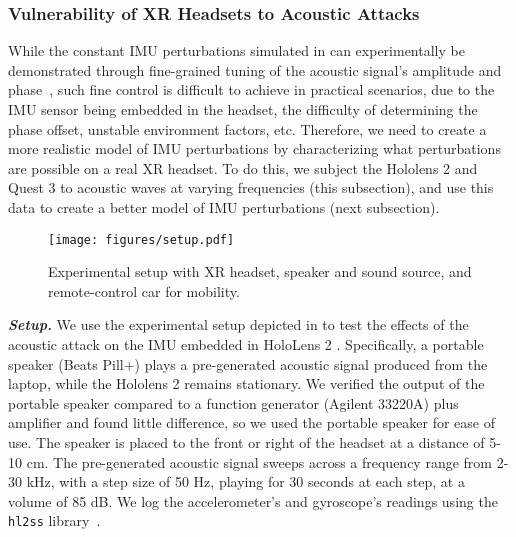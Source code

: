 \subsubsection{Vulnerability of XR Headsets to Acoustic Attacks}
\label{sec:frequency_sweep}




While the constant IMU perturbations simulated in  can experimentally be demonstrated through fine-grained tuning of the acoustic signal's amplitude and phase~\cite{trippel2017walnut,tu2018injected}, such fine control is difficult to achieve in practical scenarios, due to the IMU sensor being embedded in the headset, the difficulty of determining the phase offset, unstable environment factors, etc.
Therefore, we need to create a more realistic model of IMU perturbations by characterizing what perturbations are possible on a real XR headset.
To do this, we subject the Hololens 2 and Quest 3 to acoustic waves at varying frequencies (this subsection), and use this data to create a better model of IMU perturbations (next subsection).


\begin{figure}[h]
    \centering
    \texttt{[image: figures/setup.pdf]} %
    \caption{Experimental setup with XR headset, speaker and sound source, and remote-control car for mobility.}
    \label{fig:exp_setup}
\end{figure}


\textbf{\emph{Setup.}}
We use the experimental setup depicted in  to test the effects of the acoustic attack on the IMU embedded in HoloLens 2 \cite{ungureanu2020hololens}.
Specifically, a portable speaker (Beats Pill+) plays a pre-generated acoustic signal produced from the laptop, while the Hololens 2 remains stationary.
We verified the output of the portable speaker compared to a function generator (Agilent 33220A) plus amplifier and found little difference, so we used the portable speaker for ease of use.
The speaker is placed to the front or right of the headset at a distance of 5-10 cm.
The pre-generated acoustic signal sweeps across a frequency range from 2-30 kHz, with a step size of 50 Hz, playing for 30 seconds at each step, at a volume of 85 dB.
We log the accelerometer's and gyroscope's readings using the \texttt{hl2ss} library~\cite{dibene2022hololens}.


